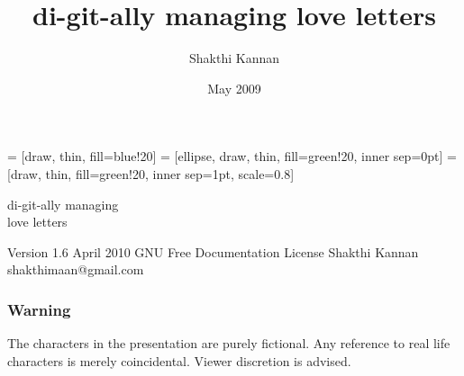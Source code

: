 \documentclass[10pt]{beamer}
\title{di-git-ally managing love letters}
\author{Shakthi Kannan}
\date{May 2009}
\institute{shakthimaan.com}
\newcommand{\medsize}[1]{\fontsize{30}{30}\selectfont #1}
\begin{document}
 = [draw, thin, fill=blue!20]
 = [ellipse, draw, thin, fill=green!20, inner sep=0pt]
 = [draw, thin, fill=green!20, inner sep=1pt, scale=0.8]

%
%

\begin{frame}[fragile]
\begin{block}{}
\begin{center}
\medsize{di-git-ally managing \\love letters}
\end{center}
\end{block}



\begin{semiverbatim}
                               Version 1.6
                                April 2010
            GNU Free Documentation License
                            Shakthi Kannan
                     shakthimaan@gmail.com
\end{semiverbatim}
\end{frame}

%
%

\begin{frame}[fragile]
\frametitle{Warning}
\begin{center}
\medsize{The characters in the presentation are purely fictional. 
Any reference to real life characters is merely coincidental. 
Viewer discretion is advised.}
\end{center}
\end{frame}

%
%
\end{document}
